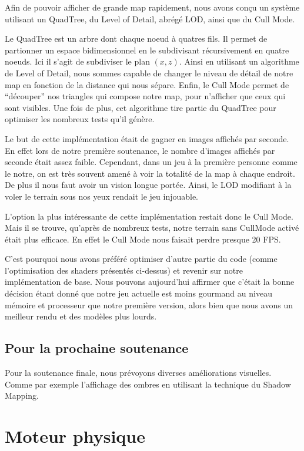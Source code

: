 \documentclass[11pt]{report}
\begin{document}
Afin de pouvoir afficher de grande map rapidement, nous avons conçu un système utilisant un QuadTree, du Level of Detail, abrégé LOD, ainsi que du Cull Mode.

Le QuadTree est un arbre dont chaque noeud à quatres fils. Il permet de partionner un espace bidimensionnel en le subdivisant récursivement en quatre noeuds. Ici il s'agit de subdiviser le plan \((x,z)\). Ainsi en utilisant un algorithme de Level of Detail, nous sommes capable de changer le niveau de détail de notre map en fonction de la distance qui nous sépare. Enfin, le Cull Mode permet de ``découper'' nos triangles qui compose notre map, pour n'afficher que ceux qui sont visibles. Une fois de plus, cet algorithme tire partie du QuadTree pour optimiser les nombreux tests qu'il génère.

Le but de cette implémentation était de gagner en images affichés par seconde. En effet lors de notre première soutenance, le nombre d'images affichés par seconde était assez faible. Cependant, dans un jeu à la première personne comme le notre, on est très souvent amené à voir la totalité de la map à chaque endroit. De plus il nous faut avoir un vision longue portée. Ainsi, le LOD modifiant à la voler le terrain sous nos yeux rendait le jeu injouable. 

L'option la plus intéressante de cette implémentation restait donc le Cull Mode. Mais il se trouve, qu'après de nombreux tests, notre terrain sans CullMode activé était plus efficace. En effet le Cull Mode nous faisait perdre presque 20 FPS.

C'est pourquoi nous avons préféré optimiser d'autre partie du code (comme l'optimisation des shaders présentés ci-dessus) et revenir sur notre implémentation de base. Nous pouvons aujourd'hui affirmer que c'était la bonne décision étant donné que notre jeu actuelle est moins gourmand au niveau mémoire et processeur que notre première version, alors bien que nous avons un meilleur rendu et des modèles plus lourds.

\subsection{Pour la prochaine soutenance}

Pour la soutenance finale, nous prévoyons diverses améliorations visuelles. Comme par exemple l'affichage des ombres en utilisant la technique du Shadow Mapping.

\newpage
\section{Moteur physique}
\end{document}
